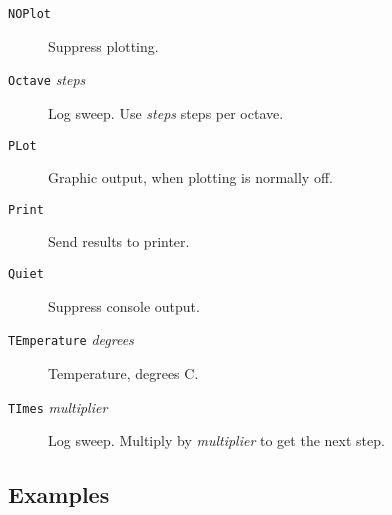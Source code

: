 \begin{description}


\item[{\tt NOPlot}] Suppress plotting.

\item[{\tt Octave} {\it steps}] Log sweep.  Use {\it
steps} steps per octave.

\item[{\tt PLot}] Graphic output, when plotting is
normally off.

\item[{\tt Print}] Send results to printer.

\item[{\tt Quiet}] Suppress console output.



\item[{\tt TEmperature} {\it degrees}] Temperature,
degrees C.

\item[{\tt TImes} {\it multiplier}] Log sweep.  Multiply
by {\it multiplier} to get the next step.


\end{description}
\subsection{Examples}

